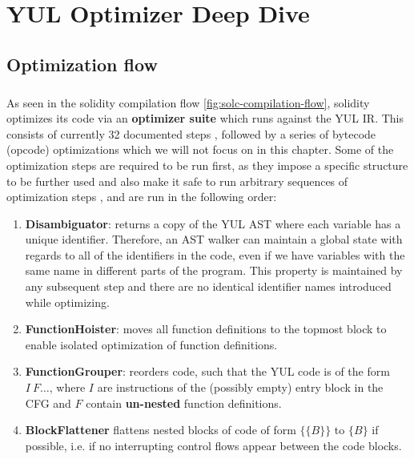 \chapter{YUL Optimizer Deep Dive}
\section{Optimization flow}
\paragraph*{}
As seen in the solidity compilation flow \ref{fig:solc-compilation-flow}, solidity optimizes its code via an \textbf{optimizer suite} which runs against the YUL IR. This consists of currently 32 documented steps \cite{solidity-yul-optimizer}, followed by a series of bytecode (opcode) optimizations which we will not focus on in this chapter. Some of the optimization steps are required to be run first, as they impose a specific structure to be further used and also make it safe to run arbitrary sequences of optimization steps \cite{solidity-yul-optimizer}, and are run in the following order:
\begin{enumerate}
    \item \textbf{Disambiguator}: returns a copy of the YUL AST where each variable has a unique identifier. Therefore, an AST walker can maintain a global state with regards to all of the identifiers in the code, even if we have variables with the same name in different parts of the program. This property is maintained by any subsequent step and there are no identical identifier names introduced while optimizing.
    \item \textbf{FunctionHoister}: moves all function definitions to the topmost block to enable isolated optimization of function definitions.
    \item \textbf{FunctionGrouper}: reorders code, such that the YUL code is of the form ${I \ F\ldots}$, where $I$ are instructions of the (possibly empty) entry block in the CFG and $F$ contain \textbf{un-nested} function definitions.
    \item \textbf{BlockFlattener} flattens nested blocks of code of form $\{\{ B \}\}$ to $\{ B \}$ if possible, i.e. if no interrupting control flows appear between the code blocks.
\end{enumerate}


